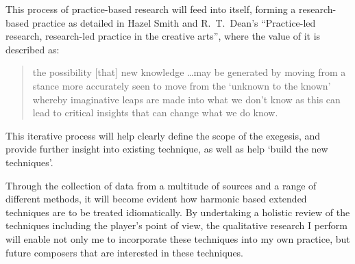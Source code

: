 This process of practice-based research will feed into itself, forming a research-based practice as detailed in Hazel Smith and R.\ T.\ Dean's ``Practice-led research, research-led practice in the creative arts'', where the value of it is described as: \begin{quotation}
    the possibility [that] new knowledge \ldots may be generated by moving from a stance more accurately seen to move from the `unknown to the known' whereby imaginative leaps are made into what we don't know as this can lead to critical insights that can change what we do know.\autocite[48]{smithPracticeledResearchResearchled2009}
\end{quotation}
This iterative process will help clearly define the scope of the exegesis, and provide further insight into existing technique, as well as help `build the new techniques'.

Through the collection of data from a multitude of sources and a range of different methods, it will become evident how harmonic based extended techniques are to be treated idiomatically. 
By undertaking a holistic review of the techniques including the player's point of view, the qualitative research I perform will enable not only me to incorporate these techniques into my own practice, but future composers that are interested in these techniques.






